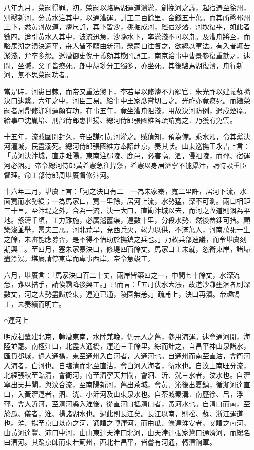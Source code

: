 八年九月，榮嗣得罪。初，榮嗣以駱馬湖運道潰淤，創挽河之議，起宿遷至徐州，別鑿新河，分黃水注其中，以通漕運。計工二百餘里，金錢五十萬。而其所鑿邳州上下，悉黃河故道，濬尺許，其下皆沙，挑掘成河，經宿沙落，河坎復平，如此者數四。迨引黃水入其中，波流迅急，沙隨水下，率淤淺不可以舟。及漕舟將至，而駱馬湖之潰決適平，舟人皆不願由新河。榮嗣自往督之，欲繩以軍法。有入者輒苦淤淺，弁卒多怨。巡漕御史倪于義劾其欺罔誤工，南京給事中曹景參復重劾之，逮問，坐贓，父子皆瘐死。郎中胡璉分工獨多，亦坐死。其後駱馬湖復潰，舟行新河，無不思榮嗣功者。

當是時，河患日棘，而帝又重法懲下，李若星以修濬不力罷官，朱光祚以建義蘇嘴決口逮繫。六年之中，河臣三易。給事中王家彥嘗切言之。光祚亦竟瘐死。而繼榮嗣者周鼎修泇利運頗有功，在事五年，竟坐漕舟阻淺，用故決河防例，遣戍煙瘴。給事中沈胤培、刑部侍郎惠世揚、總河侍郎張國維各疏請寬之，乃獲宥免雲。

十五年，流賊圍開封久，守臣謀引黃河灌之。賊偵知，預為備。乘水漲，令其黨決河灌城，民盡溺死。總河侍郎張國維方奉詔赴京，奏其狀。山東巡撫王永吉上言：「黃河決汴城，直走睢陽，東南注鄢陵、鹿邑，必害亳、泗，侵祖陵，而邳、宿運河必涸。」帝令總河侍郎黃希憲急往捍禦，希憲以身居濟寧不能攝汴，請特設重臣督理。命工部侍郎周堪賡督修汴河。

十六年二月，堪賡上言：「河之決口有二：一為朱家寨，寬二里許，居河下流，水面寬而水勢緩；一為馬家口，寬一里餘，居河上流，水勢猛，深不可測。兩口相距三十里，至汴堤之外，合為一流，決一大口，直衝汴城以去，而河之故道則涸為平地。怒濤千頃，工力難施，必廣濬舊渠，遠數十里，分殺水勢，然後畚鍤可措。顧築浚並舉，需夫三萬。河北荒旱，兗西兵火，竭力以供，不滿萬人，河南萬死一生之餘，未審能應募否，是不得不借助於撫鎮之兵也。」乃敕兵部速議，而令堪賡刻期興工。至四月，塞朱家寨決口，修堤四百餘丈。馬家口工未就，忽衝東岸，諸埽盡漂沒。堪賡請停東岸而專事西岸。帝令急竣工。

六月，堪賡言：「馬家決口百二十丈，兩岸皆築四之一，中間七十餘丈，水深流急，難以措手，請俟霜降後興工。」已而言：「五月伏水大漲，故道沙灘壅涸者刷深數丈，河之大勢盡歸於東，運道已通，陵園無恙。」疏甫上，決口再潰。帝趣鳩工，未奏績而明亡。

○運河上

明成祖肇建北京，轉漕東南，水陸兼輓，仍元人之舊，參用海運。逮會通河開，海陸並罷。南極江口，北盡大通橋，運道三千餘里。綜而計之，自昌平神山泉諸水，匯貫都城，過大通橋，東至通州入白河者，大通河也。自通州而南至直沽，會衛河入海者，白河也。自臨清而北至直沽，會白河入海者，衛水也。自汶上南旺分流，北經張秋至臨清，會衛河，南至濟寧天井閘，會泗、沂、洸三水者，汶水也。自濟寧出天井閘，與汶合流，至南陽新河，舊出茶城，會黃、沁後出夏鎮，循泇河達直口，入黃濟運者，泗、洸、小沂河及山東泉水也。自茶城秦溝，南歷徐、呂，浮邳，會大沂河，至清河縣入淮後，從直河口抵清口者，黃河水也。自清口而南，至於瓜、儀者，淮、揚諸湖水也。過此則長江矣。長江以南，則松、蘇、浙江運道也。淮、揚至京口以南之河，通謂之轉運河，而由瓜、儀達淮安者，又謂之南河，由黃河達豐、沛曰中河，由山東達天津曰北河，由天津達張家灣曰通濟河，而總名曰漕河。其踰京師而東若薊州，西北若昌平，皆嘗有河通，轉漕餉軍。

